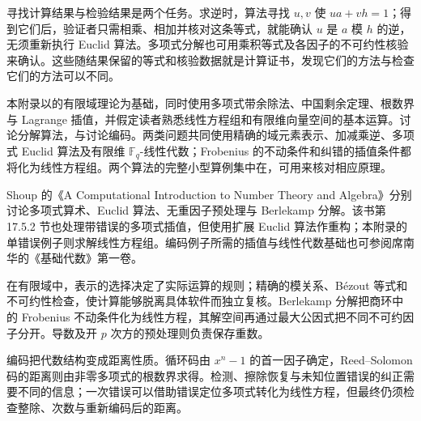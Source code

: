 \ProseParagraphBreak

寻找计算结果与检验结果是两个任务。求逆时，算法寻找 \(u,v\) 使 \(ua+vh=1\)；得到它们后，验证者只需相乘、相加并核对这条等式，就能确认 \(u\) 是 \(a\) 模 \(h\) 的逆，无须重新执行 Euclid 算法。多项式分解也可用乘积等式及各因子的不可约性核验来确认。这些随结果保留的等式和核验数据就是计算证书，发现它们的方法与检查它们的方法可以不同。

\ProseParagraphBreak

本附录以的有限域理论为基础，同时使用多项式带余除法、中国剩余定理、根数界与 Lagrange 插值，并假定读者熟悉线性方程组和有限维向量空间的基本运算。讨论分解算法，与讨论编码。两类问题共同使用精确的域元素表示、加减乘逆、多项式 Euclid 算法及有限维 \(\mathbb F_q\)-线性代数；Frobenius 的不动条件和纠错的插值条件都将化为线性方程组。两个算法的完整小型算例集中在，可用来核对相应原理。

\ProseParagraphBreak
Shoup 的《A Computational Introduction to Number Theory and Algebra》\cite[Sections 17.1, 17.3, 20.3, 20.5]{Shoup2008NumberTheoryAlgebra}分别讨论多项式算术、Euclid 算法、无重因子预处理与 Berlekamp 分解。该书第 17.5.2 节\cite[Section 17.5.2]{Shoup2008NumberTheoryAlgebra}也处理带错误的多项式插值，但使用扩展 Euclid 算法作重构；本附录的单错误例子则求解线性方程组。编码例子所需的插值与线性代数基础也可参阅席南华的《基础代数》第一卷\cite[第3章, 第6--7章]{Xi2016BasicAlgebraI}。

%
%






\begin{chaptersummary}
	在有限域中，表示的选择决定了实际运算的规则；精确的模关系、Bézout 等式和不可约性检查，使计算能够脱离具体软件而独立复核。Berlekamp 分解把商环中的 Frobenius 不动条件化为线性方程，其解空间再通过最大公因式把不同不可约因子分开。导数及开 \(p\) 次方的预处理则负责保存重数。

	\ProseParagraphBreak
	编码把代数结构变成距离性质。循环码由 \(x^n-1\) 的首一因子确定，Reed–Solomon 码的距离则由非零多项式的根数界求得。检测、擦除恢复与未知位置错误的纠正需要不同的信息；一次错误可以借助错误定位多项式转化为线性方程，但最终仍须检查整除、次数与重新编码后的距离。
\end{chaptersummary}

